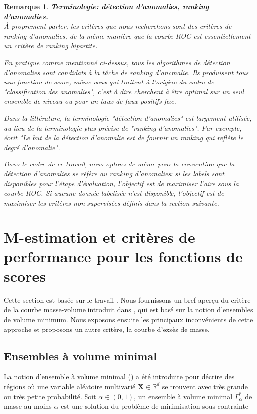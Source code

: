 \documentclass[a4paper, 12pt]{article}
\newtheorem{remarque}{Remarque}
\def\mb{\mathbf}
\def\rset{\mathbb{R}}
\begin{document}
\begin{remarque}{\bf Terminologie: détection d'anomalies, ranking d'anomalies.\\}
À proprement parler, les critères que nous recherchons sont des critères de \emph{ranking} d'anomalies, de la même manière que la courbe ROC est essentiellement un critère de \emph{ranking} bipartite.
%

En pratique comme mentionné ci-dessus, tous les algorithmes de détection d'anomalies sont candidats à la tâche de ranking d'anomalie. Ils produisent tous une fonction de score, même ceux qui traitent à l'origine du cadre de "classification des anomalies", c'est à dire cherchent à être optimal sur un seul ensemble de niveau ou pour un taux de faux positifs fixe.

Dans la littérature, la terminologie "détection d'anomalies" est largement utilisée, au lieu de la terminologie plus précise de "ranking d'anomalies". Par exemple, \cite{Liu2008} écrit "\emph{Le but de la détection d'anomalie est de fournir un ranking qui reflète le degré d'anomalie}".

Dans le cadre de ce travail, nous optons de même pour la convention que la détection d'anomalies se réfère au ranking d'anomalies: si les labels sont disponibles pour l'étape d'évaluation, l'objectif est de maximiser l'aire sous la courbe ROC. Si aucune donnée labelisée n'est disponible, l'objectif est de maximiser les critères non-supervisées définis dans la section suivante.

\end{remarque}


\section{M-estimation et critères de performance pour les fonctions de scores}
\label{resume_fr:scoring}
Cette section est basée sur le travail \cite{AISTAT15}. Nous fournissons un bref aperçu du critère de la courbe masse-volume introduit dans \cite{CLEM13}, qui est basé sur la notion d'ensembles de volume minimum. Nous exposons ensuite les principaux inconvénients de cette approche et proposons un autre critère, la courbe d'excès de masse.

\subsection{Ensembles à volume minimal}
\label{resume_fr:mv-set}

La notion d'ensemble à volume minimal (\cite{Polonik97, Einmahl1992}) a été introduite pour décrire des régions où une variable aléatoire multivarié $\mb X \in \rset^d$  se trouvent avec très grande ou très petite probabilité. Soit $\alpha \in (0,1)$, un ensemble à volume minimal $\Gamma^*_{\alpha}$ de masse au moins $\alpha $ est une solution du problème de minimisation sous contrainte
\end{document}
